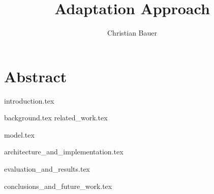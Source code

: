 \documentclass{memoir}
\title{Adaptation Approach}
\author{Christian Bauer}
\begin{document}
  \maketitle

  \tableofcontents
  \listoffigures
  \lstlistoflistings
  

  \section*{Abstract}   

  {introduction.tex}

  {background.tex}
  {related_work.tex}

  {model.tex}

  {architecture_and_implementation.tex}
  
  {evaluation_and_results.tex}

  {conclusions_and_future_work.tex}


  
  
\end{document}
